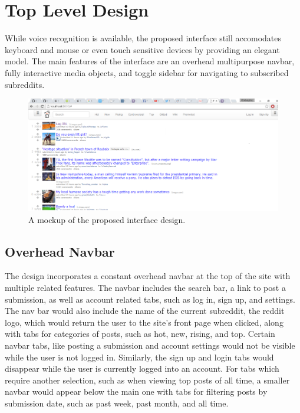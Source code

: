 \documentclass{article}
\begin{document}
\section{Top Level Design} While voice recognition is available, the proposed interface still accomodates keyboard and mouse or even touch sensitive devices by providing an elegant model. The main features of the interface are an overhead multipurpose navbar, fully interactive media objects, and toggle sidebar for navigating to subscribed subreddits.

\begin{figure}[H]
\begin{center}
\includegraphics[width=1\textwidth]{mockup.png}
\caption{A mockup of the proposed interface design.}
\end{center}
\end{figure}

\subsection{Overhead Navbar} The design incorporates a constant overhead navbar at the top of the site with multiple related features. The navbar includes the search bar, a link to post a submission, as well as account related tabs, such as log in, sign up, and settings. The nav bar would also include the name of the current subreddit, the reddit logo, which would return the user to the site's front page when clicked, along with tabs for categories of posts, such as hot, new, rising, and top. Certain navbar tabs, like posting a submission and account settings would not be visible while the user is not logged in. Similarly, the sign up and login tabs would disappear while the user is currently logged into an account. For tabs which require another selection, such as when viewing top posts of all time, a smaller navbar would appear below the main one with tabs for filtering posts by submission date, such as past week, past month, and all time.
\end{document}
